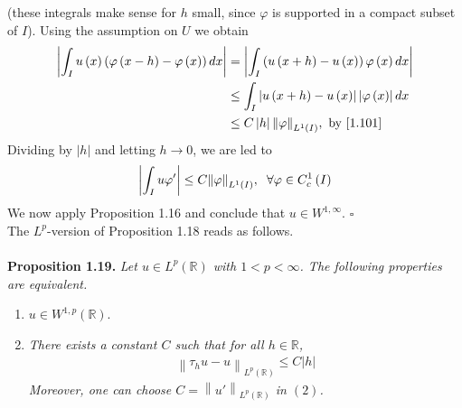 \documentclass[a4paper,oneside]{book}
\numberwithin{equation}{chapter}
\begin{document}
(these integrals make sense for $h$ small, since $\varphi$ is supported in a compact subset of $I$). Using the assumption on $U$ we obtain
\begin{align}
\left| {\int_I {u\left( x \right)\left( {\varphi \left( {x - h} \right) - \varphi \left( x \right)} \right)dx} } \right| &= \left| {\int_I {\left( {u\left( {x + h} \right) - u\left( x \right)} \right)\varphi \left( x \right)dx} } \right|\\
& \le \int_I {\left| {u\left( {x + h} \right) - u\left( x \right)} \right|\left| {\varphi \left( x \right)} \right|dx} \\
& \le C\left| h \right|{\left\| \varphi  \right\|_{{L^1}\left( I \right)}},\mbox{ by \eqref{1.101}}
\end{align}
Dividing by $\left| h \right|$ and letting $h\to 0$, we are led to
\begin{align}
\left| {\int_I {u\varphi '} } \right| \le C{\left\| \varphi  \right\|_{{L^1}\left( I \right)}},\hspace{0.2cm}\forall \varphi  \in C_c^1\left( I \right)
\end{align}
We now apply Proposition 1.16 and conclude that $u\in W^{1,\infty}$. \hfill $\square$\\

The $L^p$-version of Proposition 1.18 reads as follows.\\
\\
\textbf{Proposition 1.19.} \textit{Let $u\in L^p\left(\mathbb{R}\right)$ with $1<p<\infty$. The following properties are equivalent.}
\begin{enumerate}
\item $u\in W^{1,p}\left(\mathbb{R}\right)$.
\item \textit{There exists a constant $C$ such that for all $h\in \mathbb{R}$,}
\begin{align}
{\left\| {{\tau _h}u - u} \right\|_{{L^p}\left( \mathbb{R} \right)}} \le C\left| h \right|
\end{align}
\textit{Moreover, one can choose $C = {\left\| {u'} \right\|_{{L^p}\left( \mathbb{R} \right)}}$ in $\left(2\right)$.}
\end{enumerate}
\end{document}
